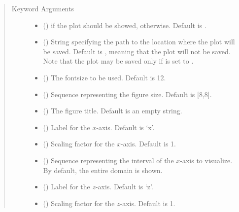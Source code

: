 \documentclass[letterpaper,10pt,english]{sphinxmanual}
\begin{document}
\begin{fulllineitems}
\begin{quote}
\begin{description}
\begin{itemize}
\end{itemize}

\item[{Keyword Arguments}] \leavevmode\begin{itemize}
\item {} 
 () \textendash{}  if the plot should be showed,  otherwise. Default is .

\item {} 
 () \textendash{} String specifying the path to the location where the plot will be saved. Default is ,
meaning that the plot will not be saved. Note that the plot may be saved only if 
is set to .

\item {} 
 () \textendash{} The fontsize to be used. Default is 12.

\item {} 
 () \textendash{} Sequence representing the figure size. Default is {[}8,8{]}.

\item {} 
 () \textendash{} The figure title. Default is an empty string.

\item {} 
 () \textendash{} Label for the \(x\)-axis. Default is ‘x’.

\item {} 
 () \textendash{} Scaling factor for the \(x\)-axis. Default is 1.

\item {} 
 () \textendash{} Sequence representing the interval of the \(x\)-axis to visualize.
By default, the entire domain is shown.

\item {} 
 () \textendash{} Label for the \(z\)-axis. Default is ‘z’.

\item {} 
 () \textendash{} Scaling factor for the \(z\)-axis. Default is 1.


\end{itemize}
\end{description}
\end{quote}
\end{fulllineitems}
\end{document}
